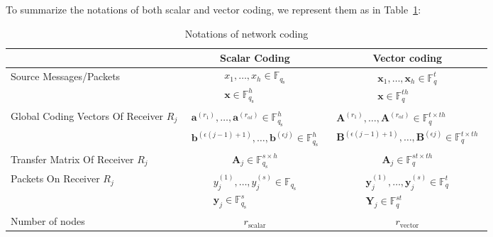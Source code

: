 To summarize the notations of both scalar and vector coding, we represent
them as in Table~\ref{tab:notations}:
\begin{table}[H]
\caption{Notations of network coding}

\label{tab:notations} 
\centering{}%
\begin{tabular}{|>{\centering}p{0.2\paperwidth}|c|c|}
\hline 
 & Scalar Coding & Vector coding\tabularnewline
\hline 
\hline 
Source Messages/Packets & $\begin{array}{c}
x_{1},\ldots,x_{h}\in\ensuremath{\mathbb{F}}_{q_{\mathrm{s}}}\\
\boldsymbol{x}\in\ensuremath{\mathbb{F}}_{q_{\mathrm{s}}}^{h}
\end{array}$ & $\begin{array}{c}
\boldsymbol{x}_{1},\ldots,\boldsymbol{x}_{h}\in\ensuremath{\mathbb{F}}_{q}^{t}\\
\boldsymbol{x}\in\ensuremath{\mathbb{F}}_{q}^{th}
\end{array}$\tabularnewline
\hline 
Global Coding Vectors Of Receiver $R_{j}$ & $\begin{array}{c}
\boldsymbol{a}^{\left(r_{1}\right)},\ldots,\boldsymbol{a}^{\left(r_{\alpha l}\right)}\in\ensuremath{\mathbb{F}}_{q_{\mathrm{s}}}^{h}\\
\boldsymbol{b}^{\left(\epsilon\left(j-1\right)+1\right)},\ldots,\boldsymbol{b}^{\left(\epsilon j\right)}\in\ensuremath{\mathbb{F}}_{q_{\mathrm{s}}}^{h}
\end{array}$ & $\begin{array}{c}
\boldsymbol{A}^{\left(r_{1}\right)},\ldots,\boldsymbol{A}^{\left(r_{\alpha l}\right)}\in\ensuremath{\mathbb{F}}_{q}^{t\times th}\\
\boldsymbol{B}^{\left(\epsilon\left(j-1\right)+1\right)},\ldots,\boldsymbol{B}^{\left(\epsilon j\right)}\in\ensuremath{\mathbb{F}}_{q}^{t\times th}
\end{array}$\tabularnewline
\hline 
Transfer Matrix Of Receiver $R_{j}$ & $\boldsymbol{A}_{j}\in\ensuremath{\mathbb{F}}_{q_{\mathrm{s}}}^{s\times h}$ & $\boldsymbol{A}_{j}\in\ensuremath{\mathbb{F}}_{q}^{st\times th}$\tabularnewline
\hline 
Packets On Receiver $R_{j}$ & $\begin{array}{c}
y_{j}^{\left(1\right)},\ldots,y_{j}^{\left(s\right)}\in\ensuremath{\mathbb{F}}_{q_{\mathrm{s}}}\\
\boldsymbol{y}_{j}\in\ensuremath{\mathbb{F}}_{q_{\mathrm{s}}}^{s}
\end{array}$ & $\begin{array}{c}
\boldsymbol{y}_{j}^{\left(1\right)},\ldots,\boldsymbol{y}_{j}^{\left(s\right)}\in\ensuremath{\mathbb{F}}_{q}^{t}\\
\boldsymbol{Y}_{j}\in\ensuremath{\mathbb{F}}_{q}^{st}
\end{array}$\tabularnewline
\hline 
Number of nodes & $r_{\mathrm{scalar}}$ & $r_{\mathrm{vector}}$\tabularnewline
\hline 
\end{tabular}
\end{table}

